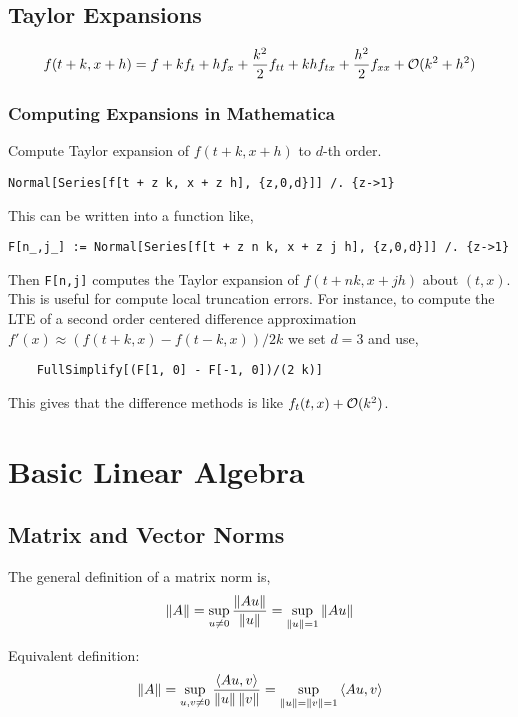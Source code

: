 \documentclass[12pt]{article}
\begin{document}
\subsection{Taylor Expansions}
\begin{align*}
    f(t+k,x+h) = f + kf_t + hf_x + \frac{k^2}{2}f_{tt} + kh f_{tx} + \frac{h^2}{2} f_{xx} + \mathcal{O}(k^2+h^2)
\end{align*}


\subsubsection{Computing Expansions in Mathematica}
Compute Taylor expansion of \( f(t+k,x+h) \) to \( d \)-th order.
\begin{lstlisting}
Normal[Series[f[t + z k, x + z h], {z,0,d}]] /. {z->1}
\end{lstlisting}

This can be written into a function like,
\begin{lstlisting}
F[n_,j_] := Normal[Series[f[t + z n k, x + z j h], {z,0,d}]] /. {z->1}
\end{lstlisting}

Then {\tt F[n,j]} computes the Taylor expansion of \( f(t+nk,x+jh) \) about \( (t,x) \). This is useful for compute local truncation errors. For instance, to compute the LTE of a second order centered difference approximation \( f'(x) \approx (f(t+k,x)-f(t-k,x))/2k \) we set \( d=3 \) and use,
\begin{lstlisting}
    FullSimplify[(F[1, 0] - F[-1, 0])/(2 k)]
\end{lstlisting}
This gives that the difference methods is like \( f_t(t,x) + \mathcal{O}(k^2) \).

\pagebreak
\section{Basic Linear Algebra}

\subsection{Matrix and Vector Norms}
The general definition of a matrix norm is,
\begin{align*}
    \left\lVert A\right\rVert = \sup_{u\neq 0} \frac{\left\lVert Au\right\rVert}{\left\lVert u\right\rVert} = \sup_{\left\lVert u\right\rVert=1} \left\lVert Au\right\rVert
\end{align*}

Equivalent definition:
\begin{align*}
    \left\lVert A\right\rVert = \sup_{u,v\neq 0} \frac{\left\langle Au,v \right\rangle}{\left\lVert u\right\rVert\left\lVert v\right\rVert} = \sup_{\left\lVert u\right\rVert=\left\lVert v\right\rVert=1} \left\langle Au,v \right\rangle
\end{align*}
 
\end{document}
